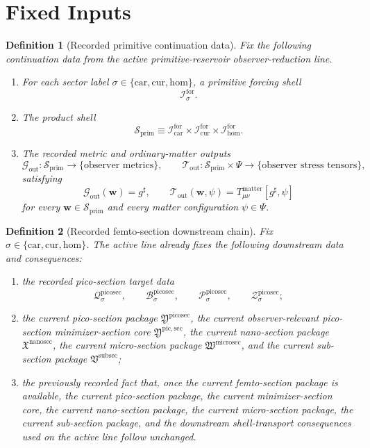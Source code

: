 \documentclass[11pt]{article}
\newcommand{\CompletedMetric}{g^{\sharp}}
\newcommand{\MatterSpace}{\Psi}
\newcommand{\Car}{\mathrm{car}}
\newcommand{\Cur}{\mathrm{cur}}
\newcommand{\Hom}{\mathrm{hom}}
\newcommand{\ForSpace}[1]{\mathcal I_{#1}^{\mathrm{for}}}
\newcommand{\PrimShell}{\mathcal S_{\mathrm{prim}}}
\newcommand{\MetricOut}{\mathscr G_{\mathrm{out}}}
\newcommand{\MatterOut}{\mathscr T_{\mathrm{out}}}
\newcommand{\SubSectionPackage}{\mathfrak V^{\mathrm{subsec}}}
\newcommand{\MicroSectionPackage}{\mathfrak W^{\mathrm{microsec}}}
\newcommand{\NanoSectionPackage}{\mathfrak X^{\mathrm{nanosec}}}
\newcommand{\PicoSectionPackage}{\mathfrak Y^{\mathrm{picosec}}}
\newcommand{\PicoSectionSpace}[1]{\mathcal Q_{#1}^{\mathrm{picosec}}}
\newcommand{\PicoSectionBody}[1]{\mathcal B_{#1}^{\mathrm{picosec}}}
\newcommand{\PicoSectionFunctional}[1]{\mathscr P_{#1}^{\mathrm{picosec}}}
\newcommand{\PicoSectionShell}[1]{\mathcal Z_{#1}^{\mathrm{picosec}}}
\newcommand{\PicoMinSectionCore}{\mathfrak Y^{\mathrm{pic,sec}}}
\newtheorem{definition}{Definition}
\begin{document}
\section{Fixed Inputs}

\begin{definition}[Recorded primitive continuation data]
\label{def:fixed}
Fix the following continuation data from the active primitive-reservoir observer-reduction line.
\begin{enumerate}
    \item For each sector label \(\sigma\in\{\Car,\Cur,\Hom\}\), a primitive forcing shell
    \[
    \ForSpace{\sigma}.
    \]
    \item The product shell
    \[
    \PrimShell
    \equiv
    \ForSpace{\Car}\times \ForSpace{\Cur}\times \ForSpace{\Hom}.
    \]
    \item The recorded metric and ordinary-matter outputs
    \[
    \MetricOut:\PrimShell\to\{\text{observer metrics}\},
    \qquad
    \MatterOut:\PrimShell\times\MatterSpace\to\{\text{observer stress tensors}\},
    \]
    satisfying
    \begin{equation}
    \MetricOut(\mathbf w)=\CompletedMetric,
    \qquad
    \MatterOut(\mathbf w,\psi)
    =
    T_{\mu\nu}^{\mathrm{matter}}[\CompletedMetric,\psi]
    \label{eq:fixedoutputs}
    \end{equation}
    for every \(\mathbf w\in\PrimShell\) and every matter configuration \(\psi\in\MatterSpace\).
\end{enumerate}
\end{definition}

\begin{definition}[Recorded femto-section downstream chain]
\label{def:downstream}
Fix \(\sigma\in\{\Car,\Cur,\Hom\}\). The active line already fixes the following downstream data and consequences:
\begin{enumerate}
    \item the recorded pico-section target data
    \[
    \PicoSectionSpace{\sigma},\qquad
    \PicoSectionBody{\sigma},\qquad
    \PicoSectionFunctional{\sigma},\qquad
    \PicoSectionShell{\sigma};
    \]
    \item the current pico-section package \(\PicoSectionPackage\), the current observer-relevant pico-section minimizer-section core \(\PicoMinSectionCore\), the current nano-section package \(\NanoSectionPackage\), the current micro-section package \(\MicroSectionPackage\), and the current sub-section package \(\SubSectionPackage\);
    \item the previously recorded fact that, once the current femto-section package is available, the current pico-section package, the current minimizer-section core, the current nano-section package, the current micro-section package, the current sub-section package, and the downstream shell-transport consequences used on the active line follow unchanged.
\end{enumerate}
\end{definition}
\end{document}
